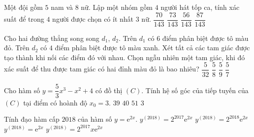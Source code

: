 \begin{ex}%
	Một đội gồm $5$ nam và $8$ nữ. Lập một nhóm gồm $4$ người hát tốp ca, tính xác suất để trong $4$ người được chọn có ít nhất $3$ nữ.
	\choice
	{\True $\dfrac{70}{143}$}
	{$\dfrac{73}{143}$}
	{$\dfrac{56}{143}$}
	{$\dfrac{87}{143}$}
\end{ex}

\begin{ex}%
	Cho hai đường thẳng song song $d_1$, $d_2$. Trên $d_1$ có $6$ điểm phân biệt được tô màu đỏ. Trên $d_2$ có $4$ điểm phân biệt được tô màu xanh. Xét tất cả các tam giác được tạo thành khi nối các điểm đó với nhau. Chọn ngẫu nhiên một tam giác, khi đó xác suất để thu được tam giác có hai đỉnh màu đỏ là bao nhiêu?
	\choice
	{$\dfrac{5}{32}$}
	{\True $\dfrac{5}{8}$}
	{$\dfrac{5}{9}$}
	{$\dfrac{5}{7}$}
\end{ex}

\begin{ex}%
	Cho hàm số $y=\dfrac{5}{3}x^3-x^2+4$ có đồ thị $(C)$. Tính hệ số góc của tiếp tuyến của $(C)$ tại điểm có hoành độ $x_0=3$.
	\choice
	{\True $39$}
	{$40$}
	{$51$}
	{$3$}
\end{ex}

\begin{ex}%
	Tính đạo hàm cấp $2018$ của hàm số $y=\mathrm{e}^{2x}$.
	\choice
	{$y^{(2018)}=2^{2017}\mathrm{e}^{2x}$}
	{\True $y^{(2018)}=2^{2018}\mathrm{e}^{2x}$}
	{$y^{(2018)}=\mathrm{e}^{2x}$}
	{$y^{(2018)}=2^{2017}x\mathrm{e}^{2x}$}
\end{ex}

